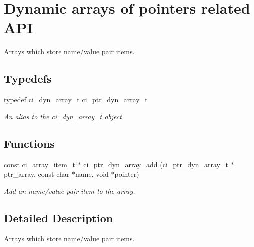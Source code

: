 \hypertarget{group__PTR__DYNAMIC__ARRAYS}{
\section{Dynamic arrays of pointers related API}
\label{group__PTR__DYNAMIC__ARRAYS}
}


Arrays which store name/value pair items.  
\subsection*{Typedefs}
\begin{DoxyCompactItemize}
\item 
typedef \hyperlink{group__DYNAMIC__ARRAYS_ga26fd79bb931b37f9c02deca8da6fe638}{ci\_\-dyn\_\-array\_\-t} \hyperlink{group__PTR__DYNAMIC__ARRAYS_gaacb64c1838c9487e46698b597537f130}{ci\_\-ptr\_\-dyn\_\-array\_\-t}
\begin{DoxyCompactList}\small\item\em An alias to the ci\_\-dyn\_\-array\_\-t object. \item\end{DoxyCompactList}\end{DoxyCompactItemize}
\subsection*{Functions}
\begin{DoxyCompactItemize}
\item 
const ci\_\-array\_\-item\_\-t $\ast$ \hyperlink{group__PTR__DYNAMIC__ARRAYS_ga857c52c31b06d749bd8809f34976766e}{ci\_\-ptr\_\-dyn\_\-array\_\-add} (\hyperlink{group__PTR__DYNAMIC__ARRAYS_gaacb64c1838c9487e46698b597537f130}{ci\_\-ptr\_\-dyn\_\-array\_\-t} $\ast$ptr\_\-array, const char $\ast$name, void $\ast$pointer)
\begin{DoxyCompactList}\small\item\em Add an name/value pair item to the array. \item\end{DoxyCompactList}\end{DoxyCompactItemize}


\subsection{Detailed Description}
Arrays which store name/value pair items. 


